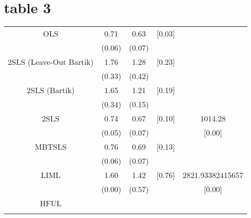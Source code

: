 \documentclass{article}
\begin{document}
\pagebreak
\section{table 3}
\begin{tabular}{ccccc}
OLS & 0.71 & 0.63 & [0.03] & \\
    & (0.06)& (0.07)&         & \\
2SLS (Leave-Out Bartik) & 1.76 & 1.28 & [0.23] & \\
    & (0.33) & (0.42) &         & \\
2SLS (Bartik) & 1.65 & 1.21 & [0.19] & \\
    & (0.34) & (0.15) &         & \\
2SLS & 0.74 & 0.67 & [0.10] & 1014.28 \\
    & (0.05)& (0.07)&         & [0.00] \\
MBTSLS & 0.76 & 0.69 & [0.13] & \\
    & (0.06)& (0.07)&         & \\
LIML & 1.60 & 1.42 & [0.76] & 2821.93382415657\\
    & (0.00)& (0.57)&         & [0.00] \\
HFUL &  &  &  &  \\
    & & &         &   \\
\end{tabular}
\end{document}
